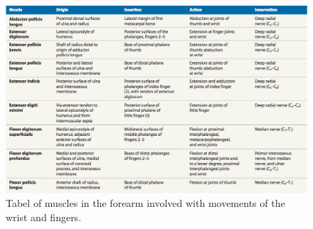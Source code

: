 \begin{figure}[H]                    
	\includegraphics[width=.4\textwidth]{figures/Anatomy/wristFingers}  %
	\caption{Tabel of muscles in the forearm involved with movements of the wrist and fingers. \cite{martini}}
	\label{fig:wristFingers}  %
\end{figure}










